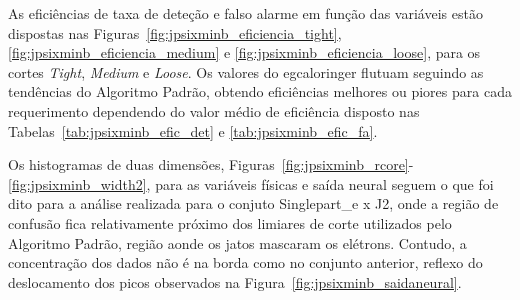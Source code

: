 As eficiências de taxa de deteção e falso alarme em função das variáveis estão
dispostas nas Figuras~\ref{fig:jpsixminb_eficiencia_tight},
\ref{fig:jpsixminb_eficiencia_medium} e \ref{fig:jpsixminb_eficiencia_loose},
para os cortes \emph{Tight}, \emph{Medium} e \emph{Loose}. Os valores do
\gls{egcaloringer} flutuam seguindo as tendências do Algoritmo Padrão, obtendo
eficiências melhores ou piores para cada requerimento dependendo do valor médio de 
eficiência disposto nas Tabelas~\ref{tab:jpsixminb_efic_det} e
\ref{tab:jpsixminb_efic_fa}.

Os histogramas de duas dimensões,
Figuras~\ref{fig:jpsixminb_rcore}-\ref{fig:jpsixminb_width2}, 
para as variáveis físicas e saída neural seguem
o que foi dito para a análise realizada para o conjuto Singlepart\_e x J2, onde
a região de confusão fica relativamente próximo dos limiares de corte utilizados
pelo Algoritmo Padrão, região aonde os jatos mascaram os elétrons.
Contudo, a concentração dos dados não é na borda como no conjunto anterior, 
reflexo do deslocamento dos picos observados na Figura~\ref{fig:jpsixminb_saidaneural}.


\begin{sidewaysfigure}[phb]
\centering
{}
\caption{Comparações das eficiências em função das variáveis $\eta$ e $E_{T}$
para ambos algoritmos no requerimento \emph{Loose}. Conjunto JPsi x Minbias.}
\label{fig:jpsixminb_eficiencia_tight}
\end{sidewaysfigure}

\begin{sidewaysfigure}[phb]
\centering
{}
\caption{Comparações das eficiências em função das variáveis $\eta$ e $E_{T}$
para ambos algoritmos no requerimento \emph{Medium}. Conjunto JPsi x Minbias.}
\label{fig:jpsixminb_eficiencia_medium}
\end{sidewaysfigure}

